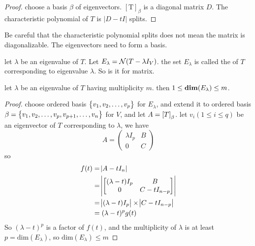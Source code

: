 \begin{proof}
    choose a basis $\beta$ of eigenvectors. $[\mathrm{T}]_\beta$ is a diagonal matrix $D$. The characteristic polynomial of $T$ is $|D - tI|$ splits.
\end{proof}

Be careful that the characteristic polynomial splits does not mean the matrix is diagonalizable. The eigenvectors need to form a basis.


\begin{definition}
    let $\lambda$ be an eigenvalue of $T$. Let $E_\lambda = \mathcal{N}(T - \lambda I_V)$. the set $E_\lambda$ is called the  of $T$ corresponding to eigenvalue $\lambda$. So is it for matrix.
\end{definition}

\begin{theorem}
    let $\lambda$ be an eigenvalue of $T$ having multiplicity $m$. then $1 \leq \dimension{E_\lambda} \leq m$.
\end{theorem}
\begin{proof}
    choose ordered basis $\set{v_1, v_2, \dots, v_p}$ for $E_\lambda$, and extend it to ordered basis $\beta =\set{v_1, v_2, \dots, v_p, v_{p+1}, \dots, v_n}$ for $V$, and let $A = \coordinate{T}_\beta$. let $v_i (1 \leq i \leq q)$ be an eigenvector of $T$ corresponding to $\lambda$, we have
    \begin{equation*}
        A = \begin{pmatrix}
            \lambda I_p & B \\
            0 & C
        \end{pmatrix}
    \end{equation*}
    so \begin{equation*}
        \begin{aligned}
            f(t) &= \abs{A - t I_n} \\
            &= \abs{\begin{bmatrix}
                (\lambda - t) I_p & B \\
                0 & C - t I_{n-p}
            \end{bmatrix}} \\
            &= \abs{(\lambda - t)I_p} \times \abs{C - t I_{n-p}} \\
            &= (\lambda - t)^p g(t)
        \end{aligned}
        \end{equation*}
    So $(\lambda - t)^p$ is a factor of $f(t)$, and the multiplicity of $\lambda$ is at least $p = \text{dim}(E_\lambda)$, so $\text{dim}(E_\lambda) \leq m$ 
\end{proof}

